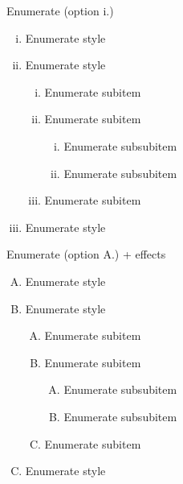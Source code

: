 \documentclass[10pt,t]{beamer}
\begin{document}
\begin{frame}{Enumerate}
(option i.)
\begin{enumerate}[i.]
	\item Enumerate style
	\item Enumerate style
	\begin{enumerate}[i.]
		\item Enumerate subitem
		\item Enumerate subitem
		\begin{enumerate}[i.]
			\item Enumerate subsubitem
			\item Enumerate subsubitem
		\end{enumerate}
		\item Enumerate subitem
	\end{enumerate}
	\item Enumerate style
\end{enumerate}
\end{frame}




\begin{frame}{Enumerate}
(option A.) + effects
\begin{enumerate}[A.]
	\item<1-5> Enumerate style
	\item<1-5> Enumerate style
	\begin{enumerate}[A.]
		\item<2-5> Enumerate subitem
		\item<3-5> Enumerate subitem
		\begin{enumerate}[A.]
			\item<3-4> Enumerate subsubitem
			\item<3-4> Enumerate subsubitem
		\end{enumerate}
		\item<4-5> Enumerate subitem
	\end{enumerate}
	\item<5> Enumerate style
\end{enumerate}
\end{frame}
\end{document}
